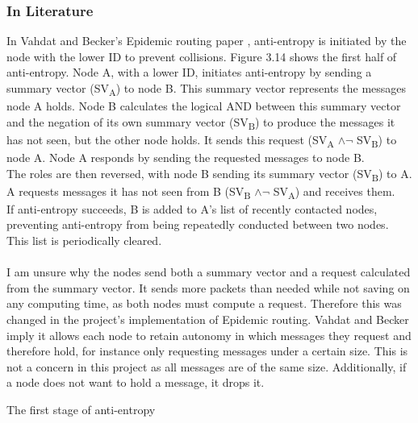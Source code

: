 \documentclass[12pt,a4paper]{report}
\makeatletter
\newenvironment{figurehere}
  {\def\@captype{figure}}
  {}
\makeatother
\begin{document}
\subsubsection{In Literature}
In Vahdat and Becker's Epidemic routing paper \cite{epidemic}, anti-entropy is initiated by the node with the lower ID to prevent collisions. Figure 3.14 shows the first half of anti-entropy. Node A, with a lower ID, initiates anti-entropy by sending a summary vector (SV\textsubscript{A}) to node B. This summary vector represents the messages node A holds. Node B calculates the logical AND between this summary vector and the negation of its own summary vector (SV\textsubscript{B}) to produce the messages it has not seen, but the other node holds. It sends this request (SV\textsubscript{A}  $\wedge \neg$ SV\textsubscript{B}) to node A. Node A responds by sending the requested messages to node B. \\
The roles are then reversed, with node B sending its summary vector (SV\textsubscript{B}) to A. A requests messages it has not seen from B (SV\textsubscript{B} $\wedge \neg$ SV\textsubscript{A}) and receives them. \\
If anti-entropy succeeds, B is added to A's list of recently contacted nodes, preventing anti-entropy from being repeatedly conducted between two nodes. This list is periodically cleared. \\ \\
I am unsure why the nodes send both a summary vector and a request calculated from the summary vector. It sends more packets than needed while not saving on any computing time, as both nodes must compute a request. Therefore this was changed in the project's implementation of Epidemic routing. Vahdat and Becker imply it allows each node to retain autonomy in which messages they request and therefore hold, for instance only requesting messages under a certain size. This is not a concern in this project as all messages are of the same size. Additionally, if a node does not want to hold a message, it drops it.
\begin{figurehere} 
\begin{center}
\end{center}
\caption{The first stage of anti-entropy \cite{epidemic}}
\end{figurehere} 
\bigskip
\end{document}

